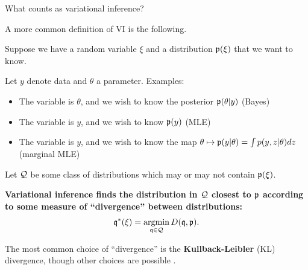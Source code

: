 

\begin{frame}{What counts as variational inference?}

A more common definition of VI is the following.

Suppose we have a random variable $\xi$ and a distribution $\mathfrak{p}(\xi)$
that we want to know.

Let $y$ denote data and $\theta$ a parameter. Examples:
\begin{itemize}
    \item The variable is $\theta$, and we wish to know the posterior
        $\mathfrak{p}(\theta | y)$ (Bayes)
    \item The variable is $y$, and we wish to know $\mathfrak{p}(y)$ (MLE)
    \item The variable is $y$, and we wish to know the map
        $\theta \mapsto  \mathfrak{p}(y | \theta) = \int p(y, z | \theta)  dz$ (marginal MLE)
\end{itemize}

Let $\mathcal{Q}$ be some class of distributions which may or may not contain
$\mathfrak{p}(\xi)$.



\begin{center}
\textbf{Variational inference finds the distribution in $\mathcal{Q}$
closest to $\mathfrak{p}$ according to some measure of ``divergence''
between distributions:}
%
\begin{align*}
%
\qopt(\xi) = \argmin{\q \in \qdom} D(\q, \p).
%
\end{align*}
%
\end{center}

The most common choice of ``divergence'' is the \textbf{Kullback-Leibler} (KL)
divergence, though other choices are possible \citep{li2016variational,
liu2016stein, ambrogioni2018wasserstein}.

\end{frame}






